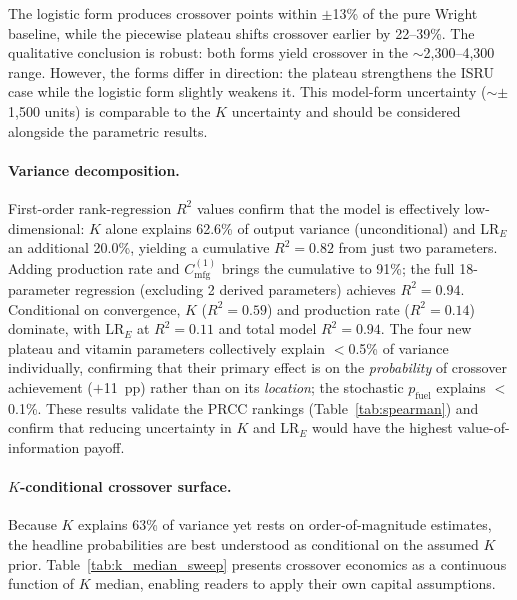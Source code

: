 \documentclass[5p,twocolumn]{elsarticle}
\begin{document}
The logistic form produces crossover points within $\pm$13\% of the pure Wright baseline, while the piecewise plateau shifts crossover earlier by 22--39\%. The qualitative conclusion is robust: both forms yield crossover in the $\sim$2{,}300--4{,}300 range. However, the forms differ in direction: the plateau strengthens the ISRU case while the logistic form slightly weakens it. This model-form uncertainty ($\sim$$\pm$1{,}500 units) is comparable to the $K$ uncertainty and should be considered alongside the parametric results.

\paragraph{Variance decomposition.}
\label{sec:sobol}
First-order rank-regression $R^2$ values confirm that the model is effectively low-dimensional: $K$ alone explains 62.6\% of output variance (unconditional) and LR$_E$ an additional 20.0\%, yielding a cumulative $R^2 = 0.82$ from just two parameters. Adding production rate and $C_{\mathrm{mfg}}^{(1)}$ brings the cumulative to 91\%; the full 18-parameter regression (excluding 2 derived parameters) achieves $R^2 = 0.94$. Conditional on convergence, $K$ ($R^2 = 0.59$) and production rate ($R^2 = 0.14$) dominate, with LR$_E$ at $R^2 = 0.11$ and total model $R^2 = 0.94$. The four new plateau and vitamin parameters collectively explain $<$0.5\% of variance individually, confirming that their primary effect is on the \emph{probability} of crossover achievement ($+$11~pp) rather than on its \emph{location}; the stochastic $p_{\mathrm{fuel}}$ explains $<$0.1\%. These results validate the PRCC rankings (Table~\ref{tab:spearman}) and confirm that reducing uncertainty in $K$ and LR$_E$ would have the highest value-of-information payoff.

\paragraph{$K$-conditional crossover surface.} Because $K$ explains 63\% of variance yet rests on order-of-magnitude estimates, the headline probabilities are best understood as conditional on the assumed $K$ prior. Table~\ref{tab:k_median_sweep} presents crossover economics as a continuous function of $K$ median, enabling readers to apply their own capital assumptions.
\end{document}
